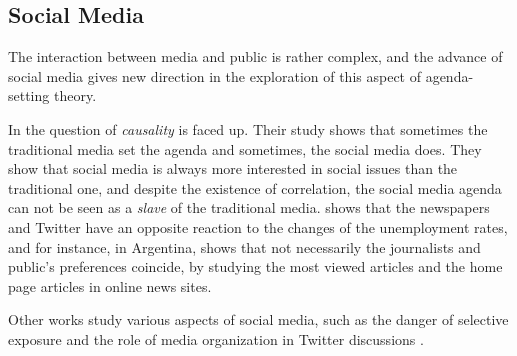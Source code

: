 \subsection{Social Media}

\par The interaction between media and public is rather complex, and the advance of social media gives new direction in the exploration of this aspect of agenda-setting theory. 
\par In \cite{russell2014dynamics} the question of \emph{causality} is faced up. Their study shows that sometimes the traditional media set the agenda and sometimes, the social media does. They show that social media is always more interested in social issues than the traditional one, and despite the existence of correlation, the social media agenda can not be seen as a \emph{slave} of the traditional media. 
\cite{soroka2017negativity} shows that the newspapers and Twitter have an opposite reaction to the changes of the unemployment rates, and for instance, in Argentina, \cite{mitchelstein2016brecha} shows that not necessarily the journalists and public's preferences coincide, by studying the most viewed articles and the home page articles in online news sites.
\par Other works study various aspects of social media, such as the danger of selective exposure \cite{feezell2017agenda}\cite{messing2014selective}\cite{bakshy2015exposure} and the role of media organization in Twitter discussions \cite{calvo2016time}\cite{malik2016macroscopic}.


